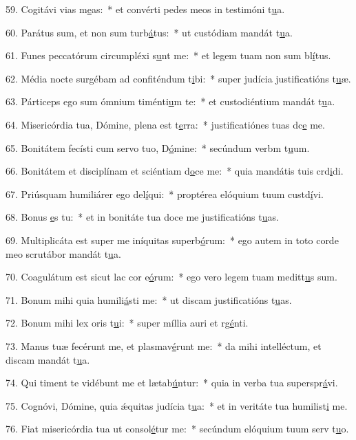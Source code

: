 59. Cogitávi vias m\uline{e}as:~* et convérti pedes meos in testimóni t\uline{u}a.\par 
60. Parátus sum, et non sum turb\uline{á}tus:~* ut custódiam mandát t\uline{u}a.\par 
61. Funes peccatórum circumpléxi s\uline{u}nt me:~* et legem tuam non sum bl\uline{í}tus.\par 
62. Média nocte surgébam ad confiténdum t\uline{i}bi:~* super judícia justificatións t\uline{u}æ.\par 
63. Párticeps ego sum ómnium timénti\uline{u}m te:~* et custodiéntium mandát t\uline{u}a.\par 
64. Misericórdia tua, Dómine, plena est t\uline{e}rra:~* justificatiónes tuas dc\uline{e} me.\par 
65. Bonitátem fecísti cum servo tuo, D\uline{ó}mine:~* secúndum verbm t\uline{u}um.\par 
66. Bonitátem et disciplínam et sciéntiam d\uline{o}ce me:~* quia mandátis tuis crd\uline{i}di.\par 
67. Priúsquam humiliárer ego del\uline{í}qui:~* proptérea elóquium tuum custd\uline{í}vi.\par 
68. Bonus \uline{e}s tu:~* et in bonitáte tua doce me justificatións t\uline{u}as.\par 
69. Multiplicáta est super me iníquitas superb\uline{ó}rum:~* ego autem in toto corde meo scrutábor mandát t\uline{u}a.\par 
70. Coagulátum est sicut lac cor e\uline{ó}rum:~* ego vero legem tuam meditt\uline{u}s sum.\par 
71. Bonum mihi quia humili\uline{á}sti me:~* ut discam justificatións t\uline{u}as.\par 
72. Bonum mihi lex oris t\uline{u}i:~* super míllia auri et rg\uline{é}nti.\par 
73. Manus tuæ fecérunt me, et plasmav\uline{é}runt me:~* da mihi intelléctum, et discam mandát t\uline{u}a.\par 
74. Qui timent te vidébunt me et lætab\uline{ú}ntur:~* quia in verba tua superspr\uline{á}vi.\par 
75. Cognóvi, Dómine, quia ǽquitas judícia t\uline{u}a:~* et in veritáte tua humilist\uline{i} me.\par 
76. Fiat misericórdia tua ut consol\uline{é}tur me:~* secúndum elóquium tuum serv t\uline{u}o.\par 
